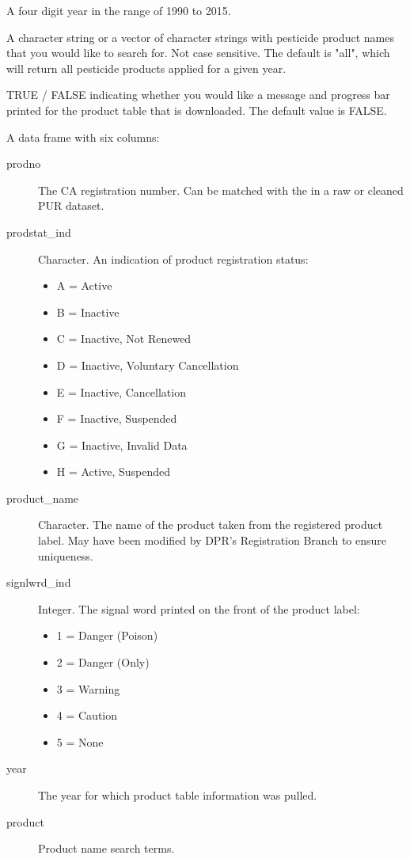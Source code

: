 \documentclass[a4paper]{book}
\begin{document}
\begin{Arguments}
\begin{ldescription}
\item[\code{year}] A four digit year in the range of 1990 to 2015.

\item[\code{products}] A character string or a vector of character strings with
pesticide product names that you would like to search for. Not case
sensitive. The default is "all", which will return all pesticide products
applied for a given year.

\item[\code{download\_progress}] TRUE / FALSE indicating whether you would like a
message and progress bar printed for the product table that is downloaded.
The default value is FALSE.
\end{ldescription}
\end{Arguments}
%
\begin{Value}
A data frame with six columns:
\begin{description}

\item[prodno] The CA registration number. Can be matched with the
 in a raw or cleaned PUR dataset.
\item[prodstat\_ind] Character. An indication of product registration status:
\begin{itemize}

\item A = Active
\item B = Inactive
\item C = Inactive, Not Renewed
\item D = Inactive, Voluntary Cancellation
\item E = Inactive, Cancellation
\item F = Inactive, Suspended
\item G = Inactive, Invalid Data
\item H = Active, Suspended
\end{itemize}

\item[product\_name] Character. The name of the product taken from the
registered product label. May have been modified by DPR's Registration Branch
to ensure uniqueness.
\item[signlwrd\_ind] Integer. The signal word printed on the front of the
product label:
\begin{itemize}

\item 1 = Danger (Poison)
\item 2 = Danger (Only)
\item 3 = Warning
\item 4 = Caution
\item 5 = None
\end{itemize}

\item[year] The year for which product table information was pulled.
\item[product] Product name search terms.

\end{description}

\end{Value}
\end{document}
